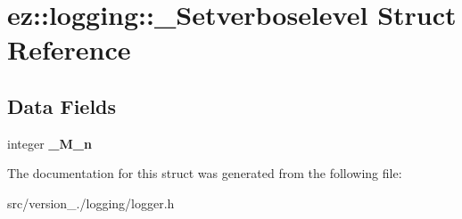 \hypertarget{structez_1_1logging_1_1__Setverboselevel}{}\section{ez\+:\+:logging\+:\+:\+\_\+\+Setverboselevel Struct Reference}
\label{structez_1_1logging_1_1__Setverboselevel}
\subsection*{Data Fields}
\begin{DoxyCompactItemize}
\item 
\mbox{\label{structez_1_1logging_1_1__Setverboselevel_a9fadbfebdb4324876495728f1d4d6bc6}} 
integer {\bfseries \+\_\+\+M\+\_\+n}
\end{DoxyCompactItemize}


The documentation for this struct was generated from the following file\+:\begin{DoxyCompactItemize}
\item 
src/version\+\_./logging/logger.\+h\end{DoxyCompactItemize}
